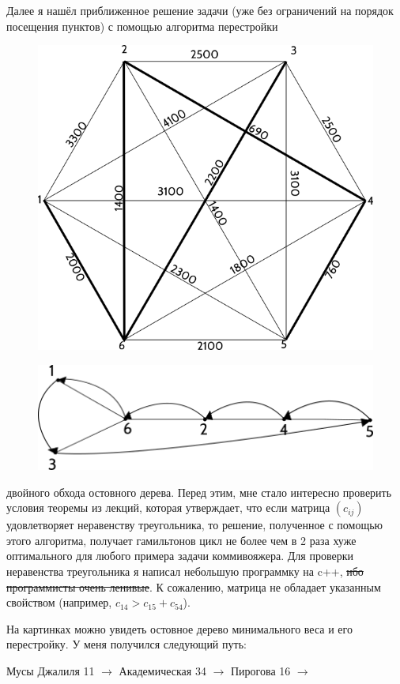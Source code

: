 \documentclass[]{article}
\begin{document}
Далее я нашёл приближенное решение задачи (уже без ограничений на порядок посещения пунктов)
с помощью алгоритма перестройки
\begin{figure}[h]
\centering
\includegraphics[scale=0.4]{graph.png}
\end{figure}
\begin{figure}[h]
\centering
\includegraphics[scale=0.4]{traverse.png}
\end{figure}
двойного обхода остовного дерева. Перед этим, мне стало интересно
проверить условия теоремы из лекций, которая утверждает, что если
матрица $(c_{ij})$ удовлетворяет неравенству треугольника, то решение, полученное
с помощью этого алгоритма, получает гамильтонов цикл не более чем в 2 раза хуже
оптимального для любого примера задачи коммивояжера. Для проверки неравенства треугольника
я написал небольшую программку на c++, \sout{ибо программисты очень ленивые}. К сожалению,
матрица не обладает указанным свойством (например, $c_{14}>c_{15}+c_{54}$).

На картинках можно увидеть остовное дерево
минимального веса и его перестройку. У меня получился следующий путь:
\par
Мусы Джалиля 11 $\rightarrow$ Академическая 34 $\rightarrow$ Пирогова 16 $\rightarrow$
\end{document}
